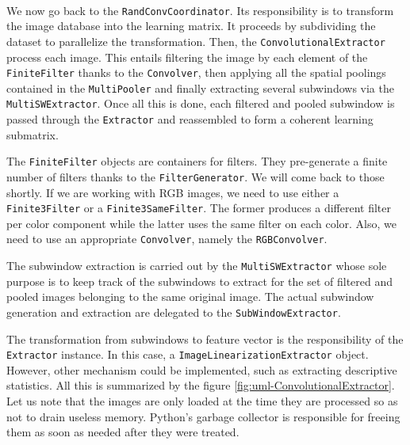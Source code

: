 \documentclass[a4paper]{report}
\begin{document}
		\paragraph{}
		We now go back to the \texttt{RandConvCoordinator}. Its responsibility is to transform the image database into the learning matrix. It proceeds by subdividing the dataset to parallelize the transformation. Then, the \texttt{ConvolutionalExtractor} process each image. This entails filtering the image by each element of the \texttt{FiniteFilter} thanks to the \texttt{Convolver}, then applying all the spatial poolings contained in the \texttt{MultiPooler} and finally extracting several subwindows via the \texttt{MultiSWExtractor}. Once all this is done, each filtered and pooled subwindow is passed through the \texttt{Extractor} and reassembled to form a coherent learning submatrix.
		\par
		The \texttt{FiniteFilter} objects are containers for filters. They pre-generate a finite number of filters thanks to the \texttt{FilterGenerator}. We will come back to those shortly. If we are working with RGB images, we need to use either a \texttt{Finite3Filter} or a \texttt{Finite3SameFilter}. The former produces a different filter per color component while the latter uses the same filter on each color. Also, we need to use an appropriate \texttt{Convolver}, namely the \texttt{RGBConvolver}.
		\par
		The subwindow extraction is carried out by the \texttt{MultiSWExtractor} whose sole purpose is to keep track of the subwindows to extract for the set of filtered and pooled images belonging to the same original image. The actual subwindow generation and extraction are delegated to the \texttt{SubWindowExtractor}.
		\par
		The transformation from subwindows to feature vector is the responsibility of the \texttt{Extractor} instance. In this case, a \texttt{ImageLinearizationExtractor} object. However, other mechanism could be implemented, such as extracting descriptive statistics.
		All this is summarized by the figure \ref{fig:uml-ConvolutionalExtractor}. Let us note that the images are only loaded at the time they are processed so as not to drain useless memory. Python's garbage collector is responsible for freeing them as soon as needed after they were treated.
		
\end{document}
